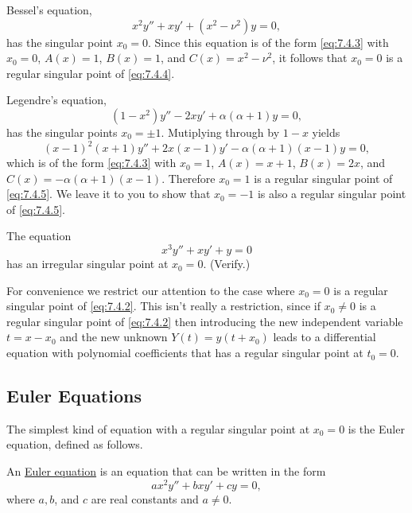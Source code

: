 \documentclass{ximera}
\begin{document}
\begin{example}\label{example:7.4.1}
Bessel's equation,
\begin{equation} \label{eq:7.4.4}
x^2y''+xy'+(x^2-\nu^2)y=0,
\end{equation}
has the singular point $x_0=0$. Since this equation is of the form
\eqref{eq:7.4.3} with $x_0=0$, $A(x)=1$, $B(x)=1$, and $C(x)=x^2-\nu^2$,
it follows that $x_0=0$ is a regular singular point of
\eqref{eq:7.4.4}.
 \end{example}

\begin{example}\label{example:7.4.2}
Legendre's equation,
\begin{equation} \label{eq:7.4.5}
(1-x^2)y''-2xy'+\alpha(\alpha+1)y=0,
\end{equation}
has the singular points $x_0=\pm1$. Mutiplying through by $1-x$
yields
$$
(x-1)^2(x+1)y''+2x(x-1)y'-\alpha(\alpha+1)(x-1)y=0,
$$
which is of the form \eqref{eq:7.4.3} with $x_0=1$, $A(x)=x+1$,
$B(x)=2x$, and $C(x)=-\alpha(\alpha+1)(x-1)$. Therefore $x_0=1$
is a regular singular point of \eqref{eq:7.4.5}. We leave it to
you to show that $x_0=-1$ is also a regular singular point of
\eqref{eq:7.4.5}.
\end{example}

\begin{example}\label{example:7.4.3}
The equation
$$
x^3y''+xy'+y=0
$$
has an irregular  singular point at $x_0=0$. (Verify.)
\end{example}

For convenience we restrict our attention to the case where $x_0=0$ is
a regular singular point of \eqref{eq:7.4.2}. This isn't  really a
restriction, since if $x_0\neq0$ is a regular singular point of
\eqref{eq:7.4.2} then  introducing the new independent variable $t=x-x_0$
and the new unknown $Y(t)=y(t+x_0)$ leads to a differential equation
with polynomial coefficients that has a regular singular point at
$t_0=0$. 

\subsection*{Euler Equations}

The simplest kind of equation with a regular singular point at $x_0=0$
is the Euler equation, defined as follows.

\begin{definition}\label{thmtype:7.4.2}
An
\href{http://www-history.mcs.st-and.ac.uk/Mathematicians/Euler.html}{Euler equation} is an equation that can be written in the
form
\begin{equation} \label{eq:7.4.6}
ax^2y''+bxy'+cy=0,
\end{equation}
where $a,b$, and $c$ are real constants and $a\neq0$.
\end{definition}
\end{document}
